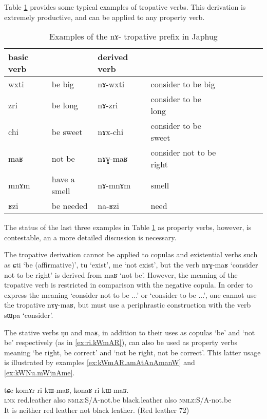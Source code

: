 \documentclass[oldfontcommands,oneside,a4paper,11pt]{article}
\newcommand{\ipa}[1]{{\phon \mbox{#1}}} %
\begin{document}
Table \ref{tab:tropative} provides some typical examples of tropative verbs. This derivation is extremely productive, and can be applied to any property verb.

\begin{table}[h]
\caption{Examples of the \ipa{nɤ}- tropative prefix in Japhug}\label{tab:tropative} \centering
\begin{tabular}{lllllllll} \toprule 
basic verb  & &derived  verb &\\
\midrule
 \ipa{wxti} & be big & \ipa{nɤ-wxti} & consider to be  big \\
 \ipa{zri} & be long & \ipa{nɤ-zri} & consider to be  long \\
  \ipa{chi} &be sweet & \ipa{nɤx-chi}  &consider to be  sweet \\
         \midrule
  \ipa{maʁ} & not be & \ipa{nɤɣ-maʁ} & consider  not to be right \\
    \ipa{mnɤm} & have a smell & \ipa{nɤ-mnɤm} & smell \\
       \ipa{ʁzi} & be needed & \ipa{na-ʁzi} & need \\
\bottomrule
\end{tabular}
\end{table}

The status of the last three examples in Table \ref{tab:tropative} as property verbs, however, is contestable, an a more detailed discussion is necessary.

The tropative derivation cannot be applied to copulas and existential verbs such as \ipa{ɕti} `be (affirmative)', \ipa{tu} `exist', \ipa{me} `not exist', but the verb \ipa{nɤɣ-maʁ} `consider not to be right' is derived from \ipa{maʁ} `not be'. However, the meaning of the tropative verb is restricted in comparison with the negative copula.  In order to express the meaning `consider not to be ...' or `consider to be ...', one cannot use the tropative \ipa{nɤɣ-maʁ}, but must use a periphrastic construction with the verb \ipa{sɯpa} `consider'.

The stative verbs \ipa{ŋu} and \ipa{maʁ}, in addition to their uses as copulas `be' and `not be' respectively (as in \ref{ex:ri.kWmAR}), can also be used as property verbs meaning `be right, be correct' and `not be right, not be correct'. This latter usage is illustrated by examples \ref{ex:kWmAR.amAtAnAmanW}  and \ref{ex:kWNu.mWjnAme}.
\begin{exe}
\ex \label{ex:ri.kWmAR}
\gll
\ipa{tɕe} 	\ipa{komɤr} 	\ipa{ri} 	\ipa{kɯ-maʁ,} 	\ipa{konaʁ} 	\ipa{ri} 	\ipa{kɯ-maʁ.} \\
\textsc{lnk} red.leather also \textsc{nmlz}:S/A-not.be  black.leather also \textsc{nmlz}:S/A-not.be \\
\glt It is neither red leather not black leather. (Red leather 72)
\end{exe}
\end{document}

